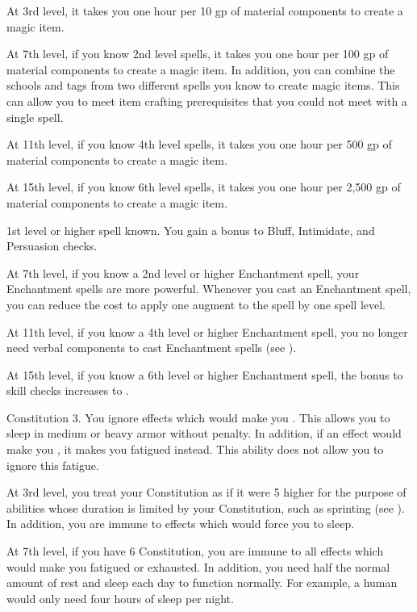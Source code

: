     At 3rd level, it takes you one hour per 10 gp of material components to create a magic item. %

    At 7th level, if you know 2nd level spells, it takes you one hour per 100 gp of material components to create a magic item. %
    In addition, you can combine the schools and tags from two different spells you know to create magic items.
    This can allow you to meet item crafting prerequisites that you could not meet with a single spell.

    At 11th level, if you know 4th level spells, it takes you one hour per 500 gp of material components to create a magic item. %

    At 15th level, if you know 6th level spells, it takes you one hour per 2,500 gp of material components to create a magic item. %

    \featpres 1st level or higher  spell known.
    \featben You gain a  bonus to Bluff, Intimidate, and Persuasion checks.

    At 7th level, if you know a 2nd level or higher Enchantment spell, your Enchantment spells are more powerful.
    Whenever you cast an Enchantment spell, you can reduce the cost to apply one augment to the spell by one spell level.

    At 11th level, if you know a 4th level or higher Enchantment spell, you no longer need verbal components to cast Enchantment spells (see ).

    At 15th level, if you know a 6th level or higher Enchantment spell, the bonus to skill checks increases to .

    \featpre Constitution 3.
    \featben You ignore effects which would make you \fatigued.
    This allows you to sleep in medium or heavy armor without penalty.
    In addition, if an effect would make you \exhausted, it makes you fatigued instead.
    This ability does not allow you to ignore this fatigue.

    At 3rd level, you treat your Constitution as if it were 5 higher for the purpose of abilities whose duration is limited by your Constitution, such as sprinting (see ).
    In addition, you are immune to effects which would force you to sleep.

    At 7th level, if you have 6 Constitution, you are immune to all effects which would make you fatigued or exhausted.
    In addition, you need half the normal amount of rest and sleep each day to function normally.
    For example, a human would only need four hours of sleep per night.

